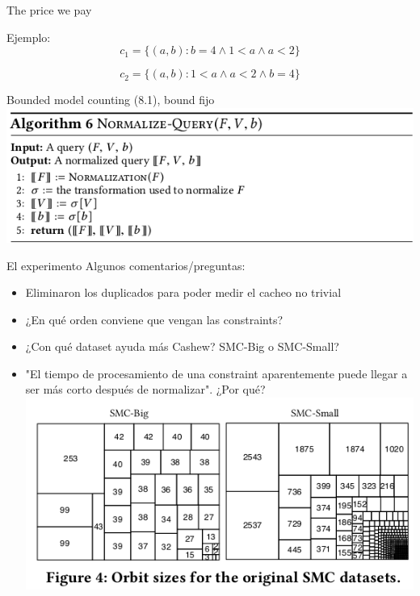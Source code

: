 \documentclass[10pt]{beamer}
\begin{document}
\begin{frame}{The price we pay}

Ejemplo:
$$c_1 = \{(a,b): b = 4 \land 1<a \land a<2\}$$

$$c_2 = \{(a,b): 1<a \land a<2 \land b =4\}$$


\end{frame}


\begin{frame}{Bounded model counting (8.1), bound fijo}
\includegraphics[scale=0.8]{alg6.png}
\end{frame}

\begin{frame}{El experimento}
	Algunos comentarios/preguntas:
	\begin{itemize}
		\item Eliminaron los duplicados para poder medir el cacheo no trivial
		\item ¿En qué orden conviene que vengan las constraints? %
		\item ¿Con qué dataset ayuda más Cashew? SMC-Big o SMC-Small?		
		\item "El tiempo de procesamiento de una constraint aparentemente puede llegar a ser más corto después de normalizar". ¿Por qué?
		\includegraphics[scale=0.7]{experiment.png}
	\end{itemize}
\end{frame}
\end{document}
